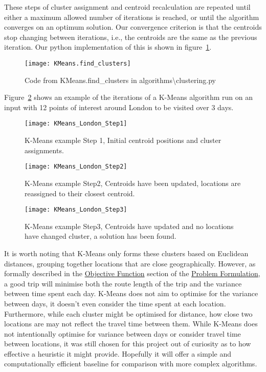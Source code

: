 \noindent
These steps of cluster assignment and centroid recalculation are repeated until either a maximum allowed number of
iterations is reached, or until the algorithm converges on an optimum solution.
Our convergence criterion is that the centroids stop changing between iterations, i.e., the centroids are the same
as the previous iteration.
Our python implementation of this is shown in figure~\ref{fig:KMeans.find_clusters}.
\begin{figure}[H]
    \centering
    \texttt{[image: KMeans.find\_clusters]}
    \caption{Code from KMeans.find\_clusters in algorithms\textbackslash clustering.py}
    \label{fig:KMeans.find_clusters}
\end{figure}

\noindent
Figure~\ref{fig:KMeans_London_Step1} shows an example of the iterations of a K-Means algorithm run on an input with
12 points of interest around London to be visited over 3 days.
\begin{figure}[H]
    \ContinuedFloat*
    \texttt{[image: KMeans\_London\_Step1]}
    \caption{K-Means example Step 1, Initial centroid positions and cluster assignments.}
    \label{fig:KMeans_London_Step1}
\end{figure}
\begin{figure}[H]
    \ContinuedFloat
    \texttt{[image: KMeans\_London\_Step2]}
    \caption{K-Means example Step2, Centroids have been updated, locations are reassigned to their closest centroid.}
    \label{fig:KMeans_London_Step2}
\end{figure}
\begin{figure}[H]
    \ContinuedFloat
    \texttt{[image: KMeans\_London\_Step3]}
    \caption{K-Means example Step3, Centroids have updated and no locations have changed cluster, a solution has been found.}
    \label{fig:KMeans_London_Step3}
\end{figure}

\noindent
It is worth noting that K-Means only forms these clusters based on Euclidean distances, grouping together locations
that are close geographically.
However, as formally described in the \hyperref[subsec:objective-function]{Objective Function} section of the
\hyperref[sec:problem-formulation]{Problem Formulation}, a good trip will minimise both the route length of the trip
and the variance between time spent each day.
K-Means does not aim to optimise for the variance between days, it doesn't even consider the time spent at each
location.
Furthermore, while each cluster might be optimised for distance, how close two locations are may not reflect the travel
time between them.
While K-Means does not intentionally optimise for variance between days or consider travel time between locations, it
was still chosen for this project out of curiosity as to how effective a heuristic it might provide.
Hopefully it will offer a simple and computationally efficient baseline for comparison with more complex
algorithms.

